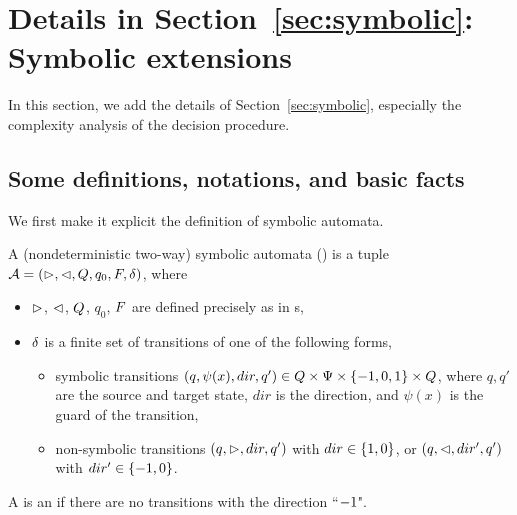 \section{Details in Section~\ref{sec:symbolic}: Symbolic extensions}\label{app-sym}

In this section, we add the details of Section~\ref{sec:symbolic}, especially the complexity analysis of the decision procedure.

\subsection{Some definitions, notations, and basic facts}

We first make it explicit the definition of symbolic automata. 

\begin{definition}\label{def-2sa}
    A (nondeterministic two-way)  symbolic automata (\SSA) is a tuple $\mathcal{A} = (\vartriangleright, \vartriangleleft, Q, q_0, F, \delta)$, where  
\begin{itemize}
%
\item $\vartriangleright$, $\vartriangleleft$, $Q$, $q_0$, $F$ are defined precisely as in \FFA{}s, 
%
\item $\delta$ is a finite set of transitions of one of the following forms,
\begin{itemize}
\item     symbolic transitions $(q, \psi(x), dir, q') \in Q \times \Psi \times \{-1, 0, 1\} \times Q$, where $q, q'$ are the source and target state, $dir$ is the direction, and $\psi(x)$ is the guard of the transition, 
%
\item     non-symbolic transitions $(q, \vartriangleright, dir, q')$ with $dir \in \{1, 0\}$, or $(q, \vartriangleleft, dir', q')$ with $dir' \in \{-1,0\}$. 
\end{itemize}
\end{itemize}
A \SSA{} is an \SA{} if there are no transitions with the direction ``$-1$". 
\end{definition}

